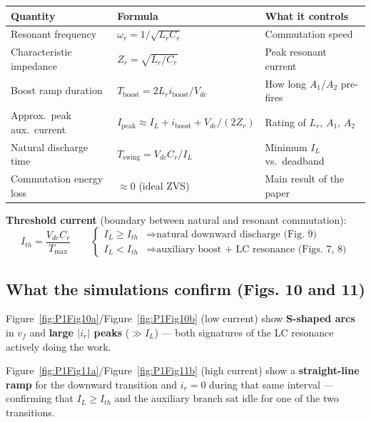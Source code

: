 \documentclass[12pt, a4paper]{article}
\def\,{ }%
\newcommand{\Vdc}{V_{dc}}
\newcommand{\ir}{i_r}
\newcommand{\IL}{I_L}
\newcommand{\Lr}{L_r}
\newcommand{\Cr}{C_r}
\newcommand{\omegar}{\omega_r}
\newcommand{\Zr}{Z_r}
\newcommand{\Ith}{I_{th}}
\newcommand{\figref}[1]{Figure~\ref{#1}}
\begin{document}
\begin{eqnbox}
\renewcommand{\arraystretch}{1.4}
\begin{tabular}{p{4.4cm} p{4.5cm} p{4.2cm}}
\toprule
\textbf{Quantity} & \textbf{Formula} & \textbf{What it controls} \\
\midrule
Resonant frequency & $\omegar = 1/\sqrt{\Lr\Cr}$ & Commutation speed \\
Characteristic impedance & $\Zr = \sqrt{\Lr/\Cr}$ & Peak resonant current \\
Boost ramp duration & $T_\text{boost} = 2\Lr\,i_\text{boost}/\Vdc$ & How long $A_1$/$A_2$ pre-fires \\
Approx.\ peak aux.\ current & $I_\text{peak} \approx \IL + i_\text{boost} + \Vdc/(2\Zr)$ & Rating of $\Lr$, $A_1$, $A_2$ \\
Natural discharge time & $T_\text{swing} = \Vdc\Cr/\IL$ & Minimum $\IL$ vs.\ deadband \\
Commutation energy loss & $\approx 0$ (ideal ZVS) & Main result of the paper \\
\bottomrule
\end{tabular}

\medskip
\textbf{Threshold current} (boundary between natural and resonant commutation):
\[
    \Ith = \frac{\Vdc\,\Cr}{T_\text{max}}
    \qquad
    \begin{cases}
        \IL \geq \Ith & \Rightarrow \text{natural downward discharge (Fig.\,9)} \\
        \IL < \Ith    & \Rightarrow \text{auxiliary boost + LC resonance (Figs.\,7, 8)}
    \end{cases}
\]
\end{eqnbox}

\subsection*{What the simulations confirm (Figs.\,10 and 11)}

\figref{fig:P1Fig10a}/\figref{fig:P1Fig10b} (low current) show
\textbf{S-shaped arcs} in $v_f$ and \textbf{large $|\ir|$ peaks}
($\gg I_L$) --- both signatures of the LC resonance actively doing the work.

\figref{fig:P1Fig11a}/\figref{fig:P1Fig11b} (high current) show a
\textbf{straight-line ramp} for the downward transition and
\textbf{$\ir = 0$} during that same interval --- confirming that
$I_L \geq \Ith$ and the auxiliary branch sat idle for one of the two
transitions.
\end{document}
